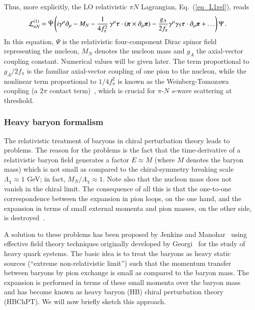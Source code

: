 \documentclass[sort&compress,preprint,3p]{elsarticle}
\begin{document}
Thus, more explicitly, the LO relativistic $\pi N$
Lagrangian, Eq.~(\ref{eq_L1rel}), reads
\begin{equation}
{\cal L}^{(1)}_{\pi N}  =  
 \bar{\Psi} \left(i\gamma^\mu \partial_\mu - M_N
-\frac{1}{4f^2_\pi} \, \gamma^\mu
\mbox{\boldmath $\tau$} \cdot 
 ( \mbox{\boldmath $\pi$}
\times
 \partial_\mu \mbox{\boldmath $\pi$})
      - \frac{g_A}{2f_\pi} \gamma^\mu \gamma_5
        \mbox{\boldmath{$\tau$}} 
	\cdot \partial_\mu \mbox{\boldmath{$\pi$}}
  + \ldots
  \right) \Psi  
\,.
\label{eq_L1relalt}
\end{equation}
In this equation,
$\Psi$ is the relativistic four-component Dirac spinor field
representing the nucleon,
$M_N$ denotes the nucleon mass and
$g_A$ the axial-vector coupling constant.
Numerical values will be given later.
The term proportional to $g_A/2f_\pi$ is the familiar axial-vector
coupling of one pion to the nucleon,
while the nonlinear term proportional to $1/4f_\pi^2$ is 
known as the Weinberg-Tomozawa coupling (a $2\pi$ contact term)~\cite{Wei66,Tom66},
which is crucial for $\pi$-$N$ $s$-wave scattering at threshold.


\subsubsection{Heavy baryon formalism}

The relativistic treatment of baryons in chiral perturbation
theory leads to problems. The reason for the problems is
the fact that the time-derivative of a relativistic baryon field generates
a factor $E\approx M$ (where $M$ denotes the baryon mass)
which is not small as compared to the chiral-symmetry breaking
scale $\Lambda_\chi \approx 1$ GeV; in fact,
$M_N/\Lambda_\chi \approx 1$.
Note also that the nucleon mass does not vanish in the chiral limit.
The consequence of all this is that the one-to-one correspondence
between the expansion in pion loops, on the one hand,
and the expansion in terms of small external momenta and pion masses,
on the other side, is destroyed~\cite{GSS88,Ber92,BKM95}.

A solution to these problems has been proposed by Jenkins and
Manohar~\cite{JM91} using effective field theory techniques
originally developed by Georgi~\cite{Geo90}
for the study of heavy quark systems.
The basic idea is to treat the baryons
as heavy static sources (``extreme non-relativistic limit'')
such that the momentum transfer between
baryons by pion exchange is small as compared to the baryon mass.
The expansion is performed in terms of these small momenta
over the baryon mass and has become known as
heavy baryon (HB)  
chiral perturbation theory (HBChPT).
We will now briefly sketch this approach.
\end{document}
